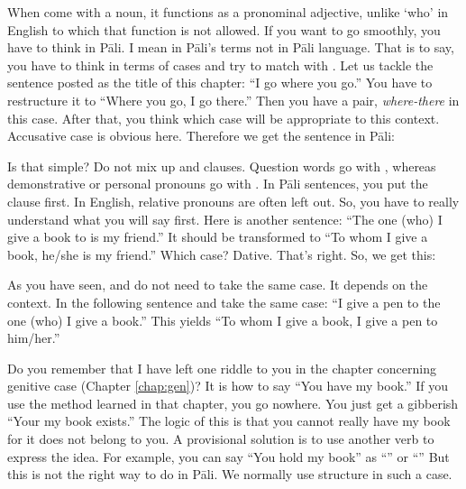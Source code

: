 
When  come with a noun, it functions as a pronominal adjective, unlike `who' in English to which that function is not allowed. If you want to go smoothly, you have to think in P\=ali. I mean in P\=ali's terms not in P\=ali language. That is to say, you have to think in terms of cases and try to match  with . Let us tackle the sentence posted as the title of this chapter: ``I go where you go.'' You have to restructure it to ``Where you go, I go there.'' Then you have a  pair, \emph{where-there} in this case. After that, you think which case will be appropriate to this context. Accusative case is obvious here. Therefore we get the sentence in P\=ali:


Is that simple? Do not mix up  and  clauses. Question words go with , whereas demonstrative or personal pronouns go with . In P\=ali sentences, you put the  clause first. In English, relative pronouns are often left out. So, you have to really understand what you will say first. Here is another sentence: ``The one (who) I give a book to is my friend.'' It should be transformed to ``To whom I give a book, he/she is my friend.'' Which case? Dative. That's right. So, we get this:


As you have seen,  and  do not need to take the same case. It depends on the context. In the following sentence  and  take the same case: ``I give a pen to the one (who) I give a book.'' This yields ``To whom I give a book, I give a pen to him/her.''


Do you remember that I have left one riddle to you in the chapter concerning genitive case (Chapter \ref{chap:gen})? It is how to say ``You have my book.'' If you use the method learned in that chapter, you go nowhere. You just get a gibberish ``Your my book exists.'' The logic of this is that you cannot really have my book for it does not belong to you. A provisional solution is to use another verb to express the idea. For example, you can say ``You hold my book'' as ``'' or ``'' But this is not the right way to do in P\=ali. We normally use  structure in such a case.

